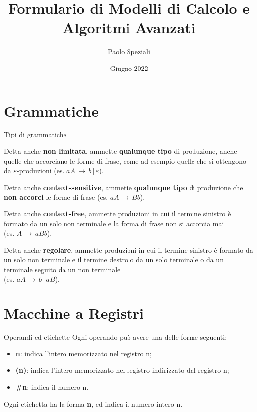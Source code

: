 \documentclass[10pt,a4paper]{article}
\title{Formulario di Modelli di Calcolo e Algoritmi Avanzati}
\author{Paolo Speziali}
\date{Giugno 2022}
\begin{document}
\small
\begin{multicols}{3}

\maketitle
\thispagestyle{empty}


\section{Grammatiche}


\begin{textbox}{Tipi di grammatiche}

Detta anche \textbf{non limitata}, ammette \textbf{qualunque tipo}
di produzione, anche quelle che accorciano le forme di
frase, come ad esempio quelle che si ottengono da \(\varepsilon\)-produzioni
(es. \(aA\,\rightarrow\,b\,|\,\varepsilon\)).

Detta anche \textbf{context-sensitive}, ammette \textbf{qualunque tipo}
di produzione che \textbf{non accorci} le forme di frase
(es. \(aA\,\rightarrow\,Bb\)).

Detta anche \textbf{context-free}, ammette produzioni in cui
il termine sinistro è formato da un solo non terminale
e la forma di frase non si accorcia mai \\
(es. \(A\,\rightarrow\,aBb\)).

Detta anche \textbf{regolare}, ammette produzioni in cui
il termine sinistro è formato da un solo non terminale
e il termine destro o da un solo terminale o da un
terminale seguito da un non terminale\\
(es. \(aA\,\rightarrow\,b\,|\,aB\)).

\end{textbox}

\section{Macchine a Registri}

\begin{textbox}{Operandi ed etichette}
Ogni operando  può avere una delle forme seguenti:
\begin{itemize}[leftmargin=*]
    \item \textbf{n}:  indica l’intero memorizzato nel registro n;
    \item \textbf{(n)}:  indica l’intero memorizzato nel registro indirizzato dal
    registro n;
    \item \textbf{\#n}:  indica il numero n.
\end{itemize}
Ogni etichetta  ha la forma \textbf{n}, ed indica il numero intero n.
\end{textbox}


\end{multicols}
\end{document}
